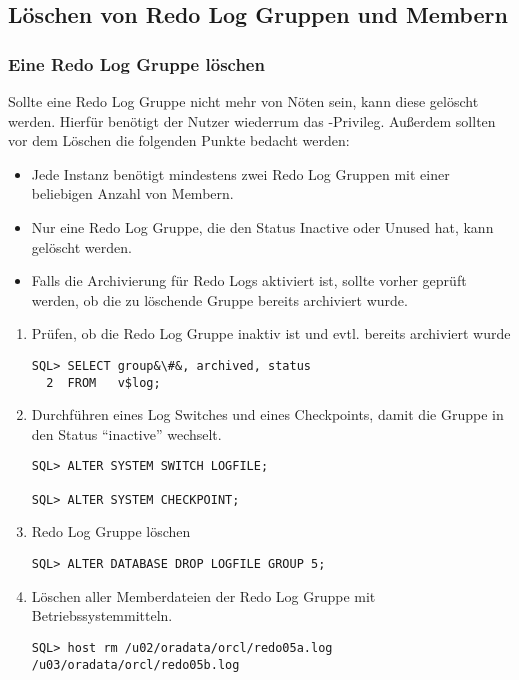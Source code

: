       \subsection{Löschen von Redo Log Gruppen und Membern}
        \subsubsection{Eine Redo Log Gruppe löschen}
          Sollte eine Redo Log Gruppe nicht mehr von Nöten sein, kann diese gelöscht werden. Hierfür benötigt der Nutzer wiederrum das -Privileg. Außerdem sollten vor dem Löschen die folgenden Punkte bedacht werden:
          \begin{itemize}
            \item Jede Instanz benötigt mindestens zwei Redo Log Gruppen mit einer beliebigen Anzahl von Membern.
            \item Nur eine Redo Log Gruppe, die den Status Inactive oder Unused hat, kann gelöscht werden.
            \item Falls die Archivierung für Redo Logs aktiviert ist, sollte vorher geprüft werden, ob die zu löschende Gruppe bereits archiviert wurde.
          \end{itemize}
\clearpage
            \begin{enumerate}
              \item Prüfen, ob die Redo Log Gruppe inaktiv ist und evtl. bereits archiviert wurde
                \begin{lstlisting}[caption={Status der Redo Logs prüfen},label=admin40,language=oracle_sql]
SQL> SELECT group&\#&, archived, status
  2  FROM   v$log;
                \end{lstlisting}
              \item Durchführen eines Log Switches und eines Checkpoints, damit die Gruppe in den Status \enquote{inactive} wechselt.
                \begin{lstlisting}[caption={Log Switch + Checkpoint durchführen},label=admin41,language=oracle_sql]
SQL> ALTER SYSTEM SWITCH LOGFILE;

SQL> ALTER SYSTEM CHECKPOINT;
                \end{lstlisting}
              \item Redo Log Gruppe löschen
              \begin{lstlisting}[caption={Log Gruppe löschen},label=admin42,language=oracle_sql]
SQL> ALTER DATABASE DROP LOGFILE GROUP 5;
                \end{lstlisting}
              \item Löschen aller Memberdateien der Redo Log Gruppe mit Betriebssystemmitteln.
              \begin{lstlisting}[caption={Log Gruppe löschen},label=admin42a,language=sqlplus]
SQL> host rm /u02/oradata/orcl/redo05a.log /u03/oradata/orcl/redo05b.log
                \end{lstlisting}
            \end{enumerate}
